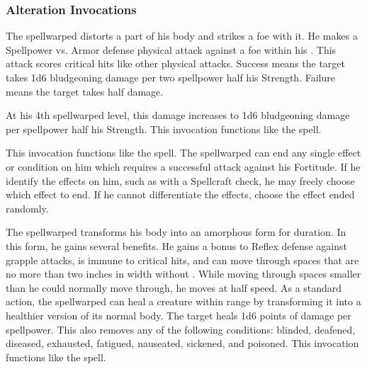         \subsubsection{Alteration Invocations}
            The spellwarped distorts a part of his body and strikes a foe with it.
            He makes a Spellpower vs. Armor defense physical attack against a foe within his .
            This attack scores critical hits like other physical attacks.
            Success means the target takes 1d6 bludgeoning damage per two spellpower \add half his Strength.
            Failure means the target takes half damage.
            \par At his 4th spellwarped level, this damage increases to 1d6 bludgeoning damage per spellpower \add half his Strength.
            This invocation functions like the  spell.

            This invocation functions like the  spell.
            The spellwarped can end any single effect or condition on him which requires a successful attack against his Fortitude.
            If he identify the effects on him, such as with a Spellcraft check, he may freely choose which effect to end.
            If he cannot differentiate the effects, choose the effect ended randomly.

            The spellwarped transforms his body into an amorphous form for \durshort duration.
            In this form, he gains several benefits.
            He gains a  bonus to Reflex defense against grapple attacks, is immune to critical hits, and can move through spaces that are no more than two inches in width without .
            While moving through spaces smaller than he could normally move through, he moves at half speed.
            As a standard action, the spellwarped can heal a creature within \rngclose range by transforming it into a healthier version of its normal body.
            The target heals 1d6 points of damage per spellpower.
            This also removes any of the following conditions: blinded, deafened, diseased, exhausted, fatigued, nauseated, sickened, and poisoned.
            This invocation functions like the  spell.

